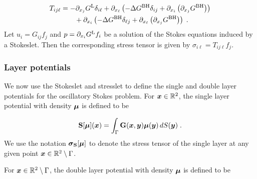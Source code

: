 \begin{align}
  T_{ij\ell} &= - \partial_{x_j} G^{\textrm{L}} \delta_{i\ell}
  + \partial_{x_\ell} \left ( -\Delta G^{\textrm{BH}} \delta_{ij} +
  \partial_{x_i} \left(\partial_{x_j} G^{\textrm{BH}} \right) \right)
  \nonumber \\
  & \qquad+ \partial_{x_i} \left ( -\Delta G^{\textrm{BH}} \delta_{\ell j} +
  \partial_{x_\ell} \left(\partial_{x_j} G^{\textrm{BH}} \right) \right)
  \; . \label{eq:ostress} 
\end{align}
Let $u_i = G_{ij} f_j$ and $p = \partial_{x_i} G^{\textrm{L}} f_i$ be a
solution of the Stokes equations induced by a Stokeslet.
Then the corresponding stress tensor is given by
$\sigma_{i\ell} = T_{ij\ell} f_j$.

%
%

\subsubsection{Layer potentials}

We now use the Stokeslet and stresslet 
to define the single
and double layer potentials for the oscillatory Stokes problem.
For ${\boldsymbol x} \in \mathbb{R}^2$, the single layer potential with density ${\boldsymbol \mu}$
is defined to be

\begin{equation} \label{eq:singlelayer}
  {\bf S} [{\boldsymbol \mu}] ({\boldsymbol x}) = \int_\Gamma {\bf G} ({\boldsymbol x},{\boldsymbol y}) {\boldsymbol \mu}({\boldsymbol y})
  \, dS({\boldsymbol y}) \; .
\end{equation}
We use the notation ${\boldsymbol \sigma}_{\bf S}[{\boldsymbol \mu}]$ to denote the
stress tensor of the single layer at any given point
${\boldsymbol x} \in \mathbb{R}^2 \setminus \Gamma$.

For ${\boldsymbol x} \in \mathbb{R}^2 \setminus \Gamma$, the double layer
potential with density ${\boldsymbol \mu}$ is defined to be


